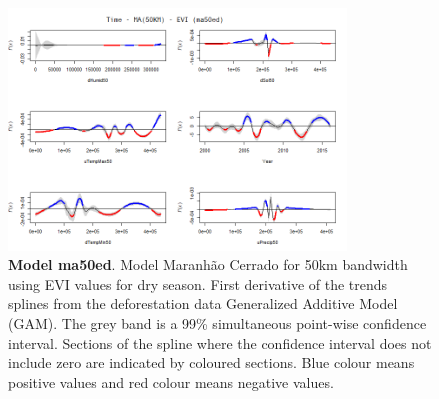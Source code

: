 \begin{table}

\begin{figure}[H]
 \centering
        \centering
        \includegraphics[width=0.8\textwidth]{ma50ed.png} %
        \caption[Model Cerrado Maranhão for 50km bandwidth using EVI values for dry season. First derivative of the trends splines from the deforestation data Generalized Additive Model (GAM)]{\textbf{Model ma50ed}. Model Maranhão Cerrado for 50km bandwidth using EVI values for dry season. First derivative of the trends splines from the deforestation data Generalized Additive Model (GAM). The grey band is a 99\% simultaneous point-wise confidence interval. Sections of the spline where the confidence interval does not include zero are indicated by coloured sections. Blue colour means positive values and red colour means negative values.}
\end{figure}
\end{table}

